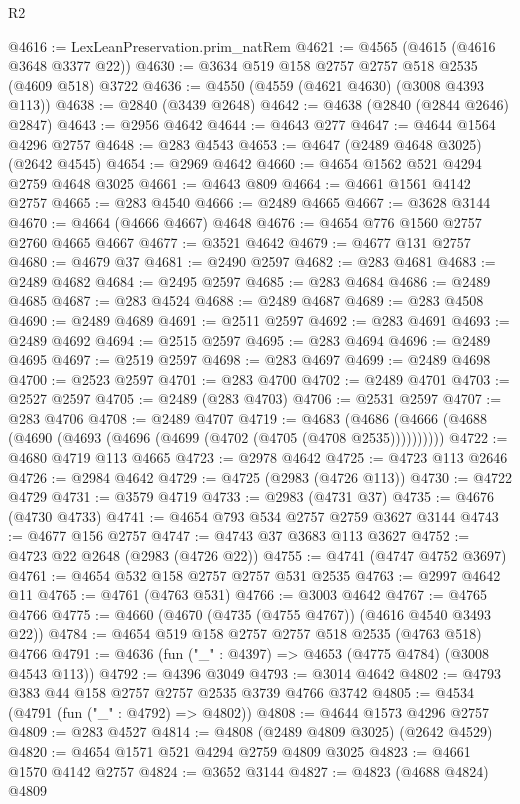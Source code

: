 \begin{lexlean}{R2}
\begin{coremodule}
@4616 := LexLeanPreservation.prim_natRem
@4621 := @4565 (@4615 (@4616 @3648 @3377 @22))
@4630 := @3634 @519 @158 @2757 @2757 @518 @2535 (@4609 @518) @3722
@4636 := @4550 (@4559 (@4621 @4630) (@3008 @4393 @113))
@4638 := @2840 (@3439 @2648)
@4642 := @4638 (@2840 (@2844 @2646) @2847)
@4643 := @2956 @4642
@4644 := @4643 @277
@4647 := @4644 @1564 @4296 @2757
@4648 := @283 @4543
@4653 := @4647 (@2489 @4648 @3025) (@2642 @4545)
@4654 := @2969 @4642
@4660 := @4654 @1562 @521 @4294 @2759 @4648 @3025
@4661 := @4643 @809
@4664 := @4661 @1561 @4142 @2757
@4665 := @283 @4540
@4666 := @2489 @4665
@4667 := @3628 @3144
@4670 := @4664 (@4666 @4667) @4648
@4676 := @4654 @776 @1560 @2757 @2760 @4665 @4667
@4677 := @3521 @4642
@4679 := @4677 @131 @2757
@4680 := @4679 @37
@4681 := @2490 @2597
@4682 := @283 @4681
@4683 := @2489 @4682
@4684 := @2495 @2597
@4685 := @283 @4684
@4686 := @2489 @4685
@4687 := @283 @4524
@4688 := @2489 @4687
@4689 := @283 @4508
@4690 := @2489 @4689
@4691 := @2511 @2597
@4692 := @283 @4691
@4693 := @2489 @4692
@4694 := @2515 @2597
@4695 := @283 @4694
@4696 := @2489 @4695
@4697 := @2519 @2597
@4698 := @283 @4697
@4699 := @2489 @4698
@4700 := @2523 @2597
@4701 := @283 @4700
@4702 := @2489 @4701
@4703 := @2527 @2597
@4705 := @2489 (@283 @4703)
@4706 := @2531 @2597
@4707 := @283 @4706
@4708 := @2489 @4707
@4719 := @4683 (@4686 (@4666 (@4688 (@4690 (@4693 (@4696 (@4699 (@4702 (@4705 (@4708 @2535))))))))))
@4722 := @4680 @4719 @113 @4665
@4723 := @2978 @4642
@4725 := @4723 @113 @2646
@4726 := @2984 @4642
@4729 := @4725 (@2983 (@4726 @113))
@4730 := @4722 @4729
@4731 := @3579 @4719
@4733 := @2983 (@4731 @37)
@4735 := @4676 (@4730 @4733)
@4741 := @4654 @793 @534 @2757 @2759 @3627 @3144
@4743 := @4677 @156 @2757
@4747 := @4743 @37 @3683 @113 @3627
@4752 := @4723 @22 @2648 (@2983 (@4726 @22))
@4755 := @4741 (@4747 @4752 @3697)
@4761 := @4654 @532 @158 @2757 @2757 @531 @2535
@4763 := @2997 @4642 @11
@4765 := @4761 (@4763 @531)
@4766 := @3003 @4642
@4767 := @4765 @4766
@4775 := @4660 (@4670 (@4735 (@4755 @4767)) (@4616 @4540 @3493 @22))
@4784 := @4654 @519 @158 @2757 @2757 @518 @2535 (@4763 @518) @4766
@4791 := @4636 (fun ("_" : @4397) => @4653 (@4775 @4784) (@3008 @4543 @113))
@4792 := @4396 @3049
@4793 := @3014 @4642
@4802 := @4793 @383 @44 @158 @2757 @2757 @2535 @3739 @4766 @3742
@4805 := @4534 (@4791 (fun ("_" : @4792) => @4802))
@4808 := @4644 @1573 @4296 @2757
@4809 := @283 @4527
@4814 := @4808 (@2489 @4809 @3025) (@2642 @4529)
@4820 := @4654 @1571 @521 @4294 @2759 @4809 @3025
@4823 := @4661 @1570 @4142 @2757
@4824 := @3652 @3144
@4827 := @4823 (@4688 @4824) @4809

\end{coremodule}
\end{lexlean}

